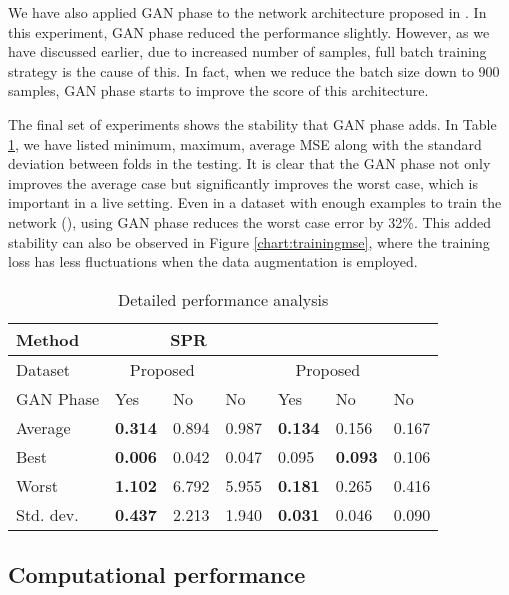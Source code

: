 \documentclass[draft, 10pt]{IEEEtran}
\begin{document}
We have also applied GAN phase to the network architecture proposed in \cite{paper0}. In this experiment, GAN phase reduced the performance slightly. However, as we have discussed earlier, due to increased number of samples, full batch training strategy is the cause of this. In fact, when we reduce the batch size down to 900 samples, GAN phase starts to improve the score of this architecture.


The final set of experiments shows the stability that GAN phase adds. In Table \ref{tbl:all}, we have listed minimum, maximum, average MSE along with the standard deviation between folds in the testing. It is clear that the GAN phase not only improves the average case but significantly improves the worst case, which is important in a live setting. Even in a dataset with enough examples to train the network (\dszero), using GAN phase reduces the worst case error by 32\%. This added stability can also be observed in Figure \ref{chart:trainingmse}, where the training loss has less fluctuations when the data augmentation is employed.


\begin{table}
\caption{Detailed performance analysis}
\begin{tabular}{l|l|l|l|l|l|l}
	Method & \multicolumn{3}{c|}{SPR} & \multicolumn{3}{c}{\dszero{}} \\\hline
	Dataset & \multicolumn{2}{c|}{Proposed} & \cite{paper0}  & \multicolumn{2}{c|}{Proposed}   & \cite{paper0} \\\hline
	GAN Phase 			& Yes            & No    &  No     &   Yes            & No             & No    \\\hline
	Average   			& \textbf{0.314} & 0.894 & 0.987   &   \textbf{0.134} & 0.156          & 0.167 \\
	Best      			& \textbf{0.006} & 0.042 & 0.047   &   0.095          & \textbf{0.093} & 0.106 \\
	Worst     			& \textbf{1.102} & 6.792 & 5.955   &   \textbf{0.181} & 0.265          & 0.416 \\
	Std. dev.       	& \textbf{0.437} & 2.213 & 1.940   &   \textbf{0.031} & 0.046          & 0.090 \\
\end{tabular}
\label{tbl:all}
\end{table}


\subsection{Computational performance}
\end{document}

